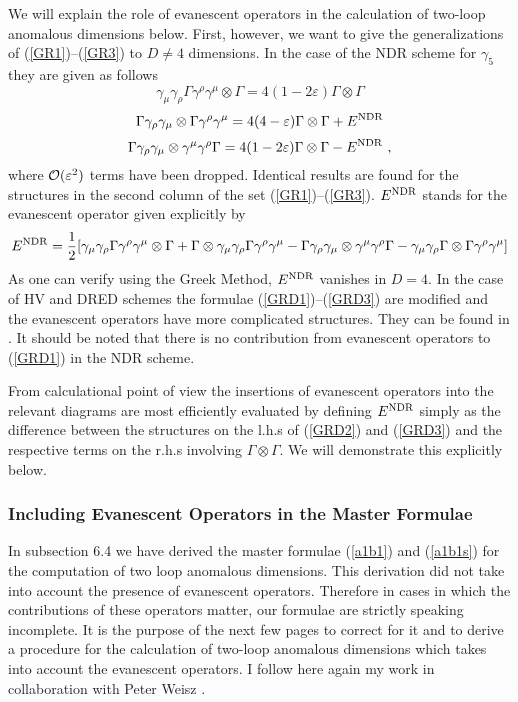 \documentclass[12pt]{article}
\newcommand{\be}{\begin{equation}}
\newcommand{\ee}{\end{equation}}
\newcommand{\ord}{{\cal O}}
\begin{document}
\begin{itemize}
\begin{itemize}
We will explain the role of evanescent operators in the calculation
of two-loop anomalous dimensions below. First, however, we want to
give the generalizations of (\ref{GR1})--(\ref{GR3}) to $D\not=4$ 
dimensions. In the case of the NDR scheme for $\gamma_5$ they are 
given as follows \cite{WEISZ}
\be\label{GRD1}
\gamma_\mu\gamma_\rho\Gamma\gamma^\rho\gamma^\mu \otimes \Gamma
=4 (1-2\varepsilon)\Gamma\otimes\Gamma
\ee
\be\label{GRD2}
\Gamma\gamma_\rho\gamma_\mu\otimes\Gamma\gamma^\rho\gamma^\mu 
=4(4-\varepsilon) \Gamma\otimes\Gamma+E^{\rm NDR}
\ee
\be\label{GRD3}
\Gamma\gamma_\rho\gamma_\mu\otimes\gamma^\mu\gamma^\rho\Gamma 
=4 (1-2\varepsilon) \Gamma\otimes\Gamma-E^{\rm NDR}~,
\ee
where $\ord(\varepsilon^2)$ terms have been dropped.
Identical results are found for the structures in the second column
of the set (\ref{GR1})--(\ref{GR3}). 
$E^{\rm NDR}$ stands for the evanescent operator
given explicitly by
\be\label{EVAN}
E^{\rm NDR}=\frac{1}{2}
[\gamma_\mu\gamma_\rho\Gamma\gamma^\rho\gamma^\mu\otimes\Gamma
+\Gamma\otimes\gamma_\mu\gamma_\rho\Gamma\gamma^\rho\gamma^\mu
-\Gamma\gamma_\rho\gamma_\mu\otimes\gamma^\mu\gamma^\rho\Gamma
-\gamma_\mu\gamma_\rho\Gamma\otimes\Gamma\gamma^\rho\gamma^\mu]
\ee
As one can verify using the Greek Method, $E^{\rm NDR}$ vanishes in
$D=4$. In the case of HV and DRED schemes the formulae 
(\ref{GRD1})--(\ref{GRD3}) 
are modified and the evanescent operators have more
complicated structures. They can be found in \cite{WEISZ}.
It should be noted that there is no contribution from evanescent
operators to (\ref{GRD1}) in the NDR scheme. 

From calculational point of view the insertions of evanescent operators
into the relevant diagrams are most efficiently evaluated by defining
$E^{\rm NDR}$ simply as the difference between the structures on the
l.h.s of (\ref{GRD2}) and (\ref{GRD3}) and the respective terms on the
r.h.s involving $\Gamma\otimes\Gamma$. We will demonstrate this 
explicitly below.  

\subsubsection{Including Evanescent Operators in the Master
Formulae}
In subsection 6.4 we have derived the master formulae (\ref{a1b1}) and 
(\ref{a1b1s}) for
the computation of two loop anomalous dimensions. This derivation
did not take into account the presence of evanescent operators.
Therefore in cases in which the contributions of these operators
matter, our formulae are strictly speaking incomplete. It is the
purpose of the next few pages to correct for it and to derive
a procedure for the calculation of two-loop anomalous dimensions
which takes into account the evanescent operators. I follow here
again my work in collaboration with Peter Weisz \cite{WEISZ}.


\end{itemize}
\end{itemize}
\end{document}
